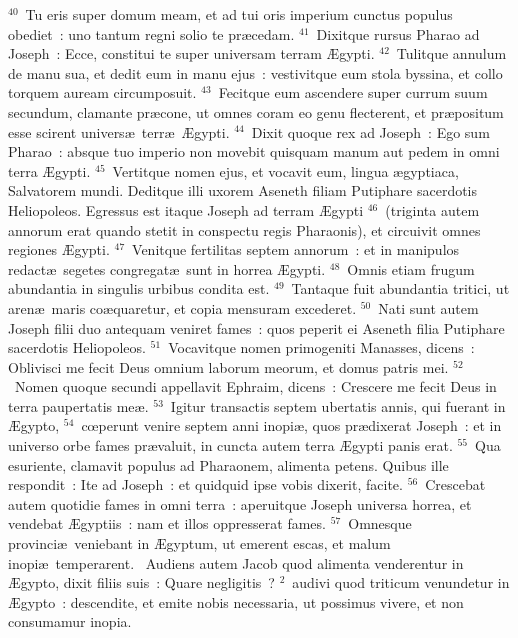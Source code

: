 ${}^{40}$~Tu eris super domum meam, et ad tui oris imperium cunctus populus obediet~: uno tantum regni solio te pr\ae cedam.
${}^{41}$~Dixitque rursus Pharao ad Joseph~: Ecce, constitui te super universam terram \AE gypti.
${}^{42}$~Tulitque annulum de manu sua, et dedit eum in manu ejus~: vestivitque eum stola byssina, et collo torquem auream circumposuit.
${}^{43}$~Fecitque eum ascendere super currum suum secundum, clamante pr\ae cone, ut omnes coram eo genu flecterent, et pr\ae positum esse scirent univers\ae\ terr\ae\ \AE gypti.
${}^{44}$~Dixit quoque rex ad Joseph~: Ego sum Pharao~: absque tuo imperio non movebit quisquam manum aut pedem in omni terra \AE gypti.
${}^{45}$~Vertitque nomen ejus, et vocavit eum, lingua \ae gyptiaca, Salvatorem mundi. Deditque illi uxorem Aseneth filiam Putiphare sacerdotis Heliopoleos. Egressus est itaque Joseph ad terram \AE gypti
${}^{46}$~(triginta autem annorum erat quando stetit in conspectu regis Pharaonis), et circuivit omnes regiones \AE gypti.
${}^{47}$~Venitque fertilitas septem annorum~: et in manipulos redact\ae\ segetes congregat\ae\ sunt in horrea \AE gypti.
${}^{48}$~Omnis etiam frugum abundantia in singulis urbibus condita est.
${}^{49}$~Tantaque fuit abundantia tritici, ut aren\ae\ maris co\ae quaretur, et copia mensuram excederet.
${}^{50}$~Nati sunt autem Joseph filii duo antequam veniret fames~: quos peperit ei Aseneth filia Putiphare sacerdotis Heliopoleos.
${}^{51}$~Vocavitque nomen primogeniti Manasses, dicens~: Oblivisci me fecit Deus omnium laborum meorum, et domus patris mei.
${}^{52}$~Nomen quoque secundi appellavit Ephraim, dicens~: Crescere me fecit Deus in terra paupertatis me\ae .
${}^{53}$~Igitur transactis septem ubertatis annis, qui fuerant in \AE gypto,
${}^{54}$~cœperunt venire septem anni inopi\ae , quos pr\ae dixerat Joseph~: et in universo orbe fames pr\ae valuit, in cuncta autem terra \AE gypti panis erat.
${}^{55}$~Qua esuriente, clamavit populus ad Pharaonem, alimenta petens. Quibus ille respondit~: Ite ad Joseph~: et quidquid ipse vobis dixerit, facite.
${}^{56}$~Crescebat autem quotidie fames in omni terra~: aperuitque Joseph universa horrea, et vendebat \AE gyptiis~: nam et illos oppresserat fames.
${}^{57}$~Omnesque provinci\ae\ veniebant in \AE gyptum, ut emerent escas, et malum inopi\ae\ temperarent.
~Audiens autem Jacob quod alimenta venderentur in \AE gypto, dixit filiis suis~: Quare negligitis~?
${}^{2}$~audivi quod triticum venundetur in \AE gypto~: descendite, et emite nobis necessaria, ut possimus vivere, et non consumamur inopia.
